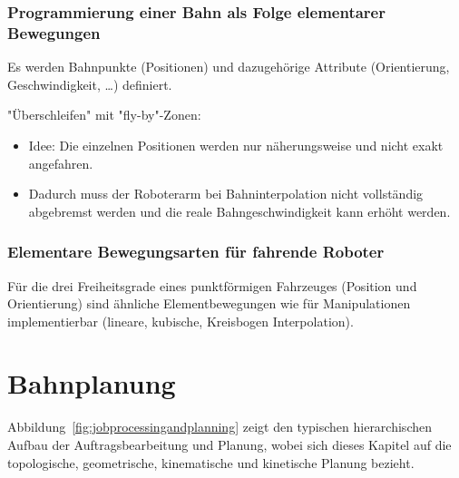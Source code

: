 		\subsection{Programmierung einer Bahn als Folge elementarer Bewegungen}
			Es werden Bahnpunkte (Positionen) und dazugehörige Attribute (Orientierung, Geschwindigkeit, \dots) definiert.
			
			"Überschleifen" mit "fly-by"-Zonen:
			\begin{itemize}
				\item Idee: Die einzelnen Positionen werden nur näherungsweise und nicht exakt angefahren.
				\item Dadurch muss der Roboterarm bei Bahninterpolation nicht vollständig abgebremst werden und die reale Bahngeschwindigkeit kann erhöht werden.
			\end{itemize}

		\subsection{Elementare Bewegungsarten für fahrende Roboter}
			Für die drei Freiheitsgrade eines punktförmigen Fahrzeuges (Position und Orientierung) sind ähnliche Elementbewegungen wie für Manipulationen implementierbar (lineare, kubische, Kreisbogen Interpolation).

\chapter{Bahnplanung}
	\label{c:bahnplanung}

	Abbildung~\ref{fig:jobprocessingandplanning} zeigt den typischen hierarchischen Aufbau der Auftragsbearbeitung und Planung, wobei sich dieses Kapitel auf die topologische, geometrische, kinematische und kinetische Planung bezieht.
	
